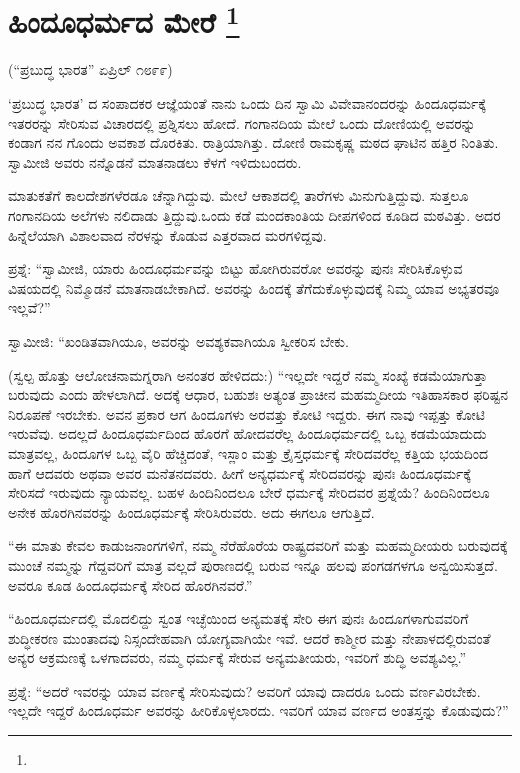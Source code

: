 
\chapter[ಹಿಂದೂಧರ್ಮದ ಮೇರೆ ]{ಹಿಂದೂಧರ್ಮದ ಮೇರೆ \protect\footnote{}}

\centerline{(“ಪ್ರಬುದ್ಧ ಭಾರತ” ಏಪ್ರಿಲ್​ ೧೮೯೯)}

‘ಪ್ರಬುದ್ಧ ಭಾರತ’ ದ ಸಂಪಾದಕರ ಆಜ್ಞೆಯಂತೆ ನಾನು ಒಂದು ದಿನ ಸ್ವಾಮಿ ವಿವೇವಾನಂದರನ್ನು ಹಿಂದೂಧರ್ಮಕ್ಕೆ ಇತರರನ್ನು ಸೇರಿಸುವ ವಿಚಾರದಲ್ಲಿ ಪ್ರಶ್ನಿಸಲು ಹೋದೆ. ಗಂಗಾನದಿಯ ಮೇಲೆ ಒಂದು ದೋಣಿಯಲ್ಲಿ ಅವರನ್ನು ಕಂಡಾಗ ನನ ಗೊಂದು ಅವಕಾಶ ದೊರಕಿತು. ರಾತ್ರಿಯಾಗಿತ್ತು. ದೋಣಿ ರಾಮಕೃಷ್ಣ ಮಠದ ಘಾಟಿನ ಹತ್ತಿರ ನಿಂತಿತು. ಸ್ವಾಮೀಜಿ ಅವರು ನನ್ನೊಡನೆ ಮಾತನಾಡಲು ಕೆಳಗೆ ಇಳಿದುಬಂದರು.

ಮಾತುಕತೆಗೆ ಕಾಲದೇಶಗಳೆರಡೂ ಚೆನ್ನಾಗಿದ್ದುವು. ಮೇಲೆ ಆಕಾಶದಲ್ಲಿ ತಾರೆಗಳು ಮಿನುಗುತ್ತಿದ್ದುವು. ಸುತ್ತಲೂ ಗಂಗಾನದಿಯ ಅಲೆಗಳು ನಲಿದಾಡು ತ್ತಿದ್ದುವು.ಒಂದು ಕಡೆ ಮಂದಕಾಂತಿಯ ದೀಪಗಳಿಂದ ಕೂಡಿದ ಮಠವಿತ್ತು. ಅದರ ಹಿನ್ನೆಲೆಯಾಗಿ ವಿಶಾಲವಾದ ನೆರಳನ್ನು ಕೊಡುವ ಎತ್ತರವಾದ ಮರಗಳಿದ್ದವು.

ಪ್ರಶ್ನೆ: “ಸ್ವಾಮೀಜಿ, ಯಾರು ಹಿಂದೂಧರ್ಮವನ್ನು ಬಿಟ್ಟು ಹೋಗಿರುವರೋ ಅವರನ್ನು ಪುನಃ ಸೇರಿಸಿಕೊಳ್ಳುವ ವಿಷಯದಲ್ಲಿ ನಿಮ್ಮೊಡನೆ ಮಾತನಾಡಬೇಕಾಗಿದೆ. ಅವರನ್ನು ಹಿಂದಕ್ಕೆ ತೆಗೆದುಕೊಳ್ಳುವುದಕ್ಕೆ ನಿಮ್ಮ ಯಾವ ಅಭ್ಯತರವೂ ಇಲ್ಲವೆ?”

ಸ್ವಾಮೀಜಿ: “ಖಂಡಿತವಾಗಿಯೂ, ಅವರನ್ನು ಅವಶ್ಯಕವಾಗಿಯೂ ಸ್ವೀಕರಿಸ ಬೇಕು.

(ಸ್ವಲ್ಪ ಹೊತ್ತು ಆಲೋಚನಾಮಗ್ನರಾಗಿ ಅನಂತರ ಹೇಳಿದದು:) “ಇಲ್ಲದೇ ಇದ್ದರೆ ನಮ್ಮ ಸಂಖ್ಯೆ ಕಡಮೆಯಾಗುತ್ತಾ ಬರುವುದು ಎಂದು ಹೇಳಲಾಗಿದೆ. ಅದಕ್ಕೆ ಆಧಾರ, ಬಹುಶಃ ಅತ್ಯಂತ ಪ್ರಾಚೀನ ಮಹಮ್ಮದೀಯ ಇತಿಹಾಸಕಾರ ಫರಿಷ್ಟನ ನಿರೂಪಣೆ ಇರಬೇಕು. ಅವನ ಪ್ರಕಾರ ಆಗ ಹಿಂದೂಗಳು ಅರವತ್ತು ಕೋಟಿ ಇದ್ದರು. ಈಗ ನಾವು ಇಪ್ಪತ್ತು ಕೋಟಿ ಇರುವೆವು. ಅದಲ್ಲದೆ ಹಿಂದೂಧರ್ಮದಿಂದ ಹೊರಗೆ ಹೋದವರೆಲ್ಲ ಹಿಂದೂಧರ್ಮದಲ್ಲಿ ಒಬ್ಬ ಕಡಮೆಯಾದುದು ಮಾತ್ರವಲ್ಲ, ಹಿಂದೂಗಳ ಒಬ್ಬ ವೈರಿ ಹೆಚ್ಚಿದಂತೆ, ಇಸ್ಲಾಂ ಮತ್ತು ಕ್ರೈಸ್ತಧರ್ಮಕ್ಕೆ ಸೇರಿದವರೆಲ್ಲ ಕತ್ತಿಯ ಭಯದಿಂದ ಹಾಗೆ ಆದವರು ಅಥವಾ ಅವರ ಮನೆತನದವರು. ಹೀಗೆ ಅನ್ಯಧರ್ಮಕ್ಕೆ ಸೇರಿದವರನ್ನು ಪುನಃ ಹಿಂದೂಧರ್ಮಕ್ಕೆ ಸೇರಿಸದೆ ಇರುವುದು ನ್ಯಾಯವಲ್ಲ. ಬಹಳ ಹಿಂದಿನಿಂದಲೂ ಬೇರೆ ಧರ್ಮಕ್ಕೆ ಸೇರಿದವರ ಪ್ರಶ್ನೆಯೆ? ಹಿಂದಿನಿಂದಲೂ ಅನೇಕ ಹೊರಗಿನವರನ್ನು ಹಿಂದೂಧರ್ಮಕ್ಕೆ ಸೇರಿಸಿರುವರು. ಅದು ಈಗಲೂ ಆಗುತ್ತಿದೆ.

“ಈ ಮಾತು ಕೇವಲ ಕಾಡುಜನಾಂಗಗಳಿಗೆ, ನಮ್ಮ ನೆರೆಹೊರೆಯ ರಾಷ್ಟ್ರದವರಿಗೆ ಮತ್ತು ಮಹಮ್ಮದೀಯರು ಬರುವುದಕ್ಕೆ ಮುಂಚೆ ನಮ್ಮನ್ನು ಗೆದ್ದವರಿಗೆ ಮಾತ್ರ ವಲ್ಲದೆ ಪುರಾಣದಲ್ಲಿ ಬರುವ ಇನ್ನೂ ಹಲವು ಪಂಗಡಗಳಗೂ ಅನ್ವಯಿಸುತ್ತದೆ. ಅವರೂ ಕೂಡ ಹಿಂದೂಧರ್ಮಕ್ಕೆ ಸೇರಿದ ಹೊರಗಿನವರೆ.”

“ಹಿಂದೂಧರ್ಮದಲ್ಲಿ ಮೊದಲಿದ್ದು ಸ್ವಂತ ಇಚ್ಛೆಯಿಂದ ಅನ್ಯಮತಕ್ಕೆ ಸೇರಿ ಈಗ ಪುನಃ ಹಿಂದೂಗಳಾಗುವವರಿಗೆ ಶುದ್ಧೀಕರಣ ಮುಂತಾದವು ನಿಸ್ಸಂದೇಹವಾಗಿ ಯೋಗ್ಯವಾಗಿಯೇ ಇವೆ. ಆದರೆ ಕಾಶ್ಮೀರ ಮತ್ತು ನೇಪಾಳದಲ್ಲಿರುವಂತೆ ಅನ್ಯರ ಆಕ್ರಮಣಕ್ಕೆ ಒಳಗಾದವರು, ನಮ್ಮ ಧರ್ಮಕ್ಕೆ ಸೇರುವ ಅನ್ಯಮತೀಯರು, ಇವರಿಗೆ ಶುದ್ಧಿ ಅವಶ್ಯವಿಲ್ಲ.”

ಪ್ರಶ್ನೆ: “ಅದರೆ ಇವರನ್ನು ಯಾವ ವರ್ಣಕ್ಕೆ ಸೇರಿಸುವುದು? ಅವರಿಗೆ ಯಾವು ದಾದರೂ ಒಂದು ವರ್ಣವಿರಬೇಕು. ಇಲ್ಲದೇ ಇದ್ದರೆ ಹಿಂದೂಧರ್ಮ ಅವರನ್ನು ಹೀರಿಕೊಳ್ಳಲಾರದು. ಇವರಿಗೆ ಯಾವ ವರ್ಣದ ಅಂತಸ್ತನ್ನು ಕೊಡುವುದು?”

